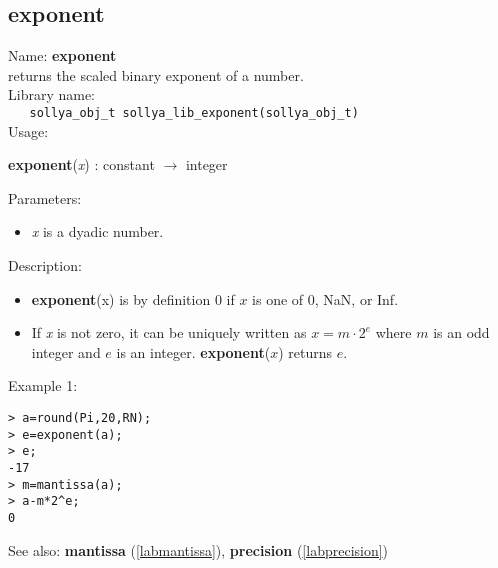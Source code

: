 \subsection{exponent}
\label{labexponent}
\noindent Name: \textbf{exponent}\\
\phantom{aaa}returns the scaled binary exponent of a number.\\[0.2cm]
\noindent Library name:\\
\verb|   sollya_obj_t sollya_lib_exponent(sollya_obj_t)|\\[0.2cm]
\noindent Usage: 
\begin{center}
\textbf{exponent}(\emph{x}) : \textsf{constant} $\rightarrow$ \textsf{integer}\\
\end{center}
Parameters: 
\begin{itemize}
\item \emph{x} is a dyadic number.
\end{itemize}
\noindent Description: \begin{itemize}

\item \textbf{exponent}(x) is by definition 0 if $x$ is one of 0, NaN, or Inf.

\item If \emph{x} is not zero, it can be uniquely written as $x = m \cdot 2^e$ where
   $m$ is an odd integer and $e$ is an integer. \textbf{exponent}($x$) returns $e$. 
\end{itemize}
\noindent Example 1: 
\begin{center}\begin{minipage}{15cm}\begin{Verbatim}[frame=single]
> a=round(Pi,20,RN);
> e=exponent(a);
> e;
-17
> m=mantissa(a);
> a-m*2^e;
0
\end{Verbatim}
\end{minipage}\end{center}
See also: \textbf{mantissa} (\ref{labmantissa}), \textbf{precision} (\ref{labprecision})

